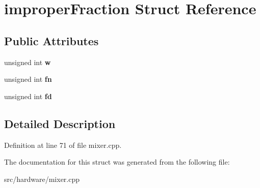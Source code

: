\hypertarget{structimproperFraction}{\section{improper\-Fraction Struct Reference}
\label{structimproperFraction}
}
\subsection*{Public Attributes}
\begin{DoxyCompactItemize}
\item 
\hypertarget{structimproperFraction_a79ffb0d5d4b535ceb6c2620850b44672}{unsigned int {\bfseries w}}\label{structimproperFraction_a79ffb0d5d4b535ceb6c2620850b44672}

\item 
\hypertarget{structimproperFraction_af96a40ff6b332bceecc14165bbe69a70}{unsigned int {\bfseries fn}}\label{structimproperFraction_af96a40ff6b332bceecc14165bbe69a70}

\item 
\hypertarget{structimproperFraction_aa6b4bf618101377f1182dc333b91190b}{unsigned int {\bfseries fd}}\label{structimproperFraction_aa6b4bf618101377f1182dc333b91190b}

\end{DoxyCompactItemize}


\subsection{Detailed Description}


Definition at line 71 of file mixer.\-cpp.



The documentation for this struct was generated from the following file\-:\begin{DoxyCompactItemize}
\item 
src/hardware/mixer.\-cpp\end{DoxyCompactItemize}
